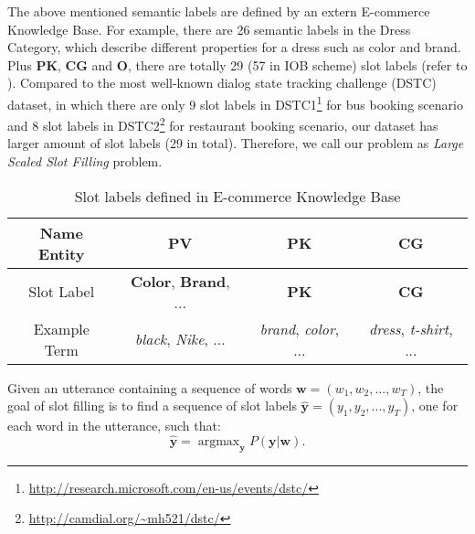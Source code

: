 The above mentioned semantic labels are defined by 
an extern E-commerce Knowledge Base. 
For example, there are 26 semantic labels in the Dress Category,
which describe different properties for a dress such as color and brand.
Plus \textbf{PK}, \textbf{CG} and \textbf{O},
there are totally 29 (57 in IOB scheme) slot labels (refer to ).
Compared to the most well-known dialog state tracking challenge (DSTC) dataset,
in which there are only 9 slot labels in DSTC1\footnote{\url{http://research.microsoft.com/en-us/events/dstc/}} for bus booking scenario
and 8 slot labels in DSTC2\footnote{\url{http://camdial.org/~mh521/dstc/}} for restaurant booking scenario,
our dataset has larger amount of slot labels (29 in total).
Therefore, we call our problem as \emph{Large Scaled Slot Filling} problem.

\begin{table}[htbp]
	\caption{Slot labels defined in E-commerce Knowledge Base}
	\label{tab:slot-labels}
	\centering
	\scriptsize
	\begin{tabular}{c|c|c|c}
		\toprule
		Name Entity & PV & PK & CG \\
		\midrule
		Slot Label & \textbf{Color}, \textbf{Brand}, ... & \textbf{PK} & \textbf{CG} \\
		\midrule
		Example Term & \emph{black}, \emph{Nike}, ... & \emph{brand}, \emph{color}, ... & \emph{dress}, \emph{t-shirt}, ... \\
		\bottomrule
	\end{tabular}
	\vspace{-10pt}
\end{table}

Given an utterance containing a sequence of
words $\textbf{w} = (w_1, w_2, ..., w_T)$,
the goal of slot filling
is to find a sequence of slot labels $\hat{\textbf{y}} = (y_1, y_2, ..., y_T)$, 
one for each word in the utterance, such that:
\begin{equation*}
	\hat{\textbf{y}} = \mathop{\arg\max}_{\textbf{y}}P(\textbf{y}|\textbf{w}).
\end{equation*}

